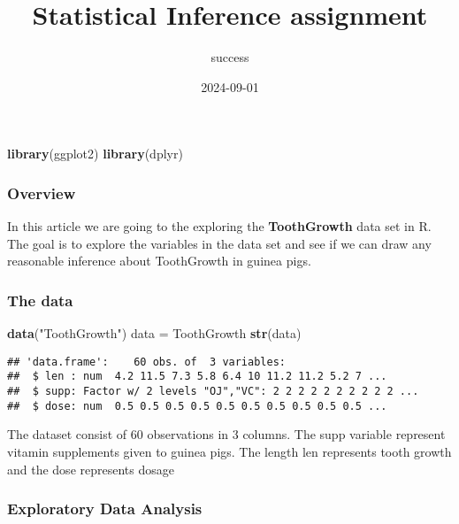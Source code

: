\documentclass[
]{article}
\title{Statistical Inference assignment}
\author{success}
\date{2024-09-01}
\newenvironment{Shaded}{\begin{snugshade}}{\end{snugshade}}
\newcommand{\FunctionTok}[1]{\textcolor[rgb]{0.13,0.29,0.53}{\textbf{#1}}}
\newcommand{\NormalTok}[1]{#1}
\newcommand{\OtherTok}[1]{\textcolor[rgb]{0.56,0.35,0.01}{#1}}
\newcommand{\StringTok}[1]{\textcolor[rgb]{0.31,0.60,0.02}{#1}}
\begin{document}
\maketitle

\begin{Shaded}
\begin{Highlighting}[]
\FunctionTok{library}\NormalTok{(ggplot2)}
\FunctionTok{library}\NormalTok{(dplyr)}
\end{Highlighting}
\end{Shaded}

\subsubsection{Overview}\label{overview}

In this article we are going to the exploring the \textbf{ToothGrowth}
data set in R. The goal is to explore the variables in the data set and
see if we can draw any reasonable inference about ToothGrowth in guinea
pigs.

\subsubsection{The data}\label{the-data}

\begin{Shaded}
\begin{Highlighting}[]
\FunctionTok{data}\NormalTok{(}\StringTok{"ToothGrowth"}\NormalTok{)}
\NormalTok{data }\OtherTok{=}\NormalTok{ ToothGrowth}
\FunctionTok{str}\NormalTok{(data)}
\end{Highlighting}
\end{Shaded}

\begin{verbatim}
## 'data.frame':    60 obs. of  3 variables:
##  $ len : num  4.2 11.5 7.3 5.8 6.4 10 11.2 11.2 5.2 7 ...
##  $ supp: Factor w/ 2 levels "OJ","VC": 2 2 2 2 2 2 2 2 2 2 ...
##  $ dose: num  0.5 0.5 0.5 0.5 0.5 0.5 0.5 0.5 0.5 0.5 ...
\end{verbatim}

The dataset consist of 60 observations in 3 columns. The supp variable
represent vitamin supplements given to guinea pigs. The length len
represents tooth growth and the dose represents dosage

\subsubsection{Exploratory Data
Analysis}\label{exploratory-data-analysis}
\end{document}
